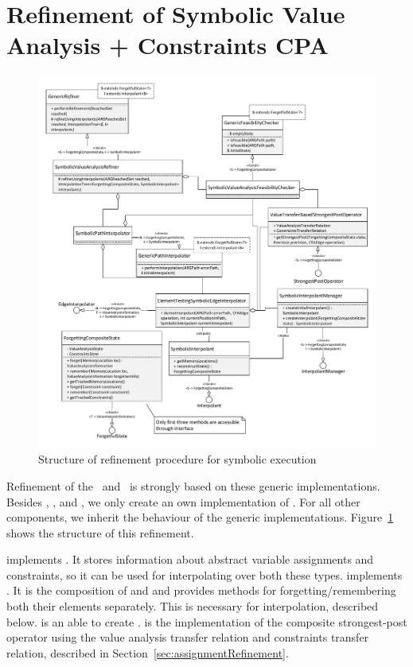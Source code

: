 \section{Refinement of Symbolic Value Analysis + Constraints CPA}

\begin{figure}[h!]
\includegraphics[width=\linewidth]{implementationCegar/RefinementSymEx}
\caption{Structure of refinement procedure for symbolic execution}
\label{fig:refSymbolic}
\end{figure}
Refinement of the \symbolicValueAnalysisCPA\ and \constraintsCPA\ is strongly based on these generic implementations.
Besides , ,  and , we only
create an own implementation of .
For all other components, we inherit the behaviour of the generic implementations.
Figure~\ref{fig:refSymbolic} shows the structure of this refinement.

 implements .
It stores information about abstract variable assignments and constraints, so it can be used for interpolating over both these types.
 implements .
It is the composition of  and  and provides methods for forgetting/remembering both their elements separately.
This is necessary for interpolation, described below.
 is an  able to create .
 is the implementation of the composite strongest-post operator using the value analysis transfer relation and constraints transfer relation,
described in Section~\ref{sec:assignmentRefinement}.

